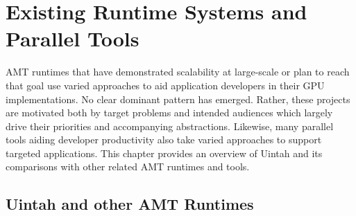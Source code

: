 \documentclass[12pt]{article}
\begin{document}
\begin{abstract}
An overview of other runtimes and parallel tools is given in Chapter \ref{ch:related}.  Chapter \ref{ch:uintah_prior} describes the prior state of Uintah's GPU runtime.  Chapter \ref{ch:uintah_current} outlines work completed to date.  Chapter \ref{ch:workplan} provides remaining work required to meet the full goal of this thesis.  Chapter \ref{ch:thesis_format} outlines the proposed thesis format.  Chapter \ref{ch:thesis_plan} gives a thesis plan.  The remainder of this document contains the conclusion, references, and a list of my publications.   

\end{abstract}

\pagebreak
\tableofcontents
\pagebreak

\cleardoublepage
{}




\section{Existing Runtime Systems and Parallel Tools}
\label{ch:related}

AMT runtimes that have demonstrated scalability at large-scale or plan to reach that goal use varied approaches to aid application developers in their GPU implementations.   No clear dominant pattern has emerged.  Rather, these projects are motivated both by target problems and intended audiences which largely drive their priorities and accompanying abstractions.  Likewise, many parallel tools aiding developer productivity also take varied approaches to support targeted applications.  This chapter provides an overview of Uintah and its comparisons with other related AMT runtimes and tools.  

\subsection{Uintah and other AMT Runtimes}
\label{ch:amt_runtimes}
\end{document}
